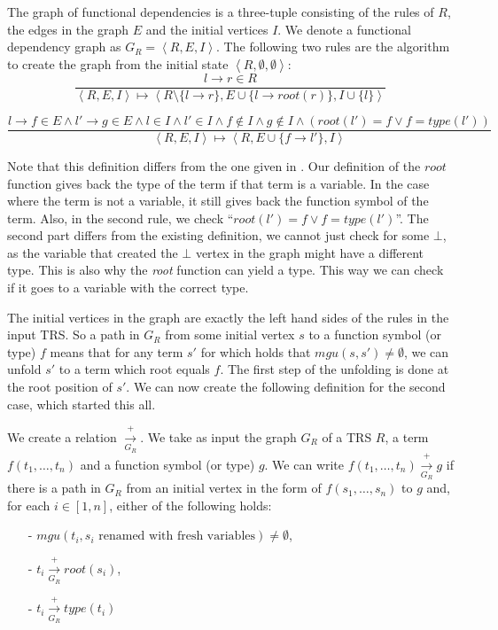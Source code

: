 The graph of functional dependencies is a three-tuple consisting of the rules of $R$, the edges in the graph $E$ and the initial vertices $I$. We denote a functional dependency graph as $G_R = \left< R, E, I \right>$. The following two rules are the algorithm to create the graph from the initial state $\left<R, \emptyset, \emptyset\right>$:
\[
\frac{l \rightarrow r \in R}{\left< R, E, I \right> \mapsto \left< R \setminus \{ l \rightarrow r\}, E \cup \{ l \rightarrow \textit{root}(r) \}, I \cup \{ l \} \right>}
\]
\begin{center}
\[
\frac{ l \rightarrow f \in E \land l' \rightarrow g \in E \land l \in I \land l' \in I \land f \notin I \land g \notin I \land (\textit{root}(l') = f \lor f = \textit{type}(l'))}{\left< R, E, I \right> \mapsto \left< R, E \cup \{ f \rightarrow l' \}, I\right>}
\]
\end{center}
Note that this definition differs from the one given in \cite{Payet:Unfolding}. Our definition of the $\textit{root}$ function gives back the type of the term if that term is a variable. In the case where the term is not a variable, it still gives back the function symbol of the term. Also, in the second rule, we check ``$\textit{root}(l') = f \lor f = \textit{type}(l')$''. The second part differs from the existing definition, we cannot just check for some $\bot$, as the variable that created the $\bot$ vertex in the graph might have a different type. This is also why the \textit{root} function can yield a type. This way we can check if it goes to a variable with the correct type. 

The initial vertices in the graph are exactly the left hand sides of the rules in the input TRS. So a path in $G_R$ from some initial vertex $s$ to a function symbol (or type) $f$ means that for any term $s'$ for which holds that $\textit{mgu}(s, s') \neq \emptyset$, we can unfold $s'$ to a term which root equals $f$. The first step of the unfolding is done at the root position of $s'$. We can now create the following definition for the second case, which started this all.

We create a relation $\xrightarrow[G_R]{+}$. We take as input the graph $G_R$ of a TRS $R$, a term $f(t_1, \dots, t_n)$ and a function symbol (or type) $g$. We can write $f(t_1, \dots, t_n) \xrightarrow[G_R]{+} g$ if there is a path in $G_R$ from an initial vertex in the form of $f(s_1, \dots, s_n)$ to $g$ and, for each $i \in [1, n]$, either of the following holds:
\begin{itemize}
    \itemsep 0em
    \item[-] $\textit{mgu}(t_i, s_i \text{ renamed with fresh variables}) \neq \emptyset$,
    \item[-] $t_i \xrightarrow[G_R]{+} \textit{root}(s_i)$,
    \item[-] $t_i \xrightarrow[G_R]{+} \textit{type}(t_i)$
\end{itemize}

